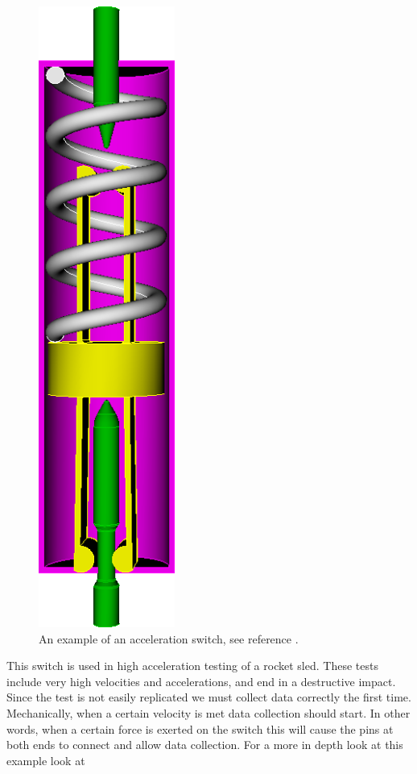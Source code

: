 \documentclass[10pt]{article}
\begin{document}
		\begin{figure}[h]
		 \begin{center}\includegraphics[scale=.2]{Acceleration_Switch.png}\end{center}
		 \caption{An example of an acceleration switch, see reference \cite{Massad2015}.}
		 \label{Acceleration Switch}
		 
		 \end{figure}
		 
		
This switch is used in high acceleration testing of a rocket sled. These tests include very high velocities and accelerations, and end in a destructive impact. Since the test is not easily replicated we must collect data correctly the first time. Mechanically, when a certain velocity is met data collection should start. In other words, when a certain force is exerted on the switch this will cause the pins at both ends to connect and allow data collection. For a more in depth look at this example look at \cite{IMSM2010}
\end{document}
